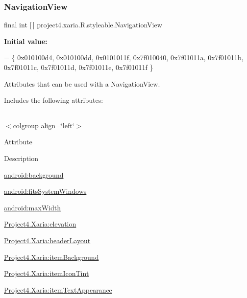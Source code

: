 \subsubsection{\texorpdfstring{Navigation\+View}{NavigationView}}
{\footnotesize\ttfamily final int \mbox{[}$\,$\mbox{]} project4.\+xaria.\+R.\+styleable.\+Navigation\+View\hspace{0.3cm}{\ttfamily [static]}}

{\bfseries Initial value\+:}
\begin{DoxyCode}
= \{
            0x010100d4, 0x010100dd, 0x0101011f, 0x7f010040,
            0x7f01011a, 0x7f01011b, 0x7f01011c, 0x7f01011d,
            0x7f01011e, 0x7f01011f
        \}
\end{DoxyCode}
Attributes that can be used with a Navigation\+View. 

Includes the following attributes\+:

\tabulinesep=1mm
\begin{longtabu} spread 0pt [c]{*{0}{|X[-1]}|}
\hline
\end{longtabu}
$<$colgroup align=\char`\"{}left\char`\"{}$>$ 

Attribute

Description 

{\ttfamily \hyperlink{classproject4_1_1xaria_1_1R_1_1styleable_a08253d19475959882eff4afebd3d702e}{android\+:background}}

{\ttfamily \hyperlink{classproject4_1_1xaria_1_1R_1_1styleable_a3a323e4a98ccce401c1e052c95ff41d0}{android\+:fits\+System\+Windows}}

{\ttfamily \hyperlink{classproject4_1_1xaria_1_1R_1_1styleable_a5a8dc1c5c2c90070efa716ca76e55965}{android\+:max\+Width}}

{\ttfamily \hyperlink{classproject4_1_1xaria_1_1R_1_1styleable_a40197d42f2fce56d33d3778b865afb7d}{Project4.\+Xaria\+:elevation}}

{\ttfamily \hyperlink{classproject4_1_1xaria_1_1R_1_1styleable_aba1cb9b91f8ee6dffd022b886c737544}{Project4.\+Xaria\+:header\+Layout}}

{\ttfamily \hyperlink{classproject4_1_1xaria_1_1R_1_1styleable_a55510ee8cd624d814f16034b63474168}{Project4.\+Xaria\+:item\+Background}}

{\ttfamily \hyperlink{classproject4_1_1xaria_1_1R_1_1styleable_a205b41948506e966136578f28f200761}{Project4.\+Xaria\+:item\+Icon\+Tint}}

{\ttfamily \hyperlink{classproject4_1_1xaria_1_1R_1_1styleable_ac1468f6b443ff3dac67ce32e0eca086f}{Project4.\+Xaria\+:item\+Text\+Appearance}}

